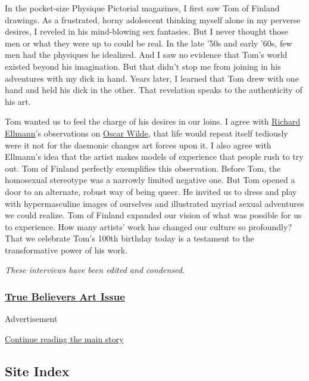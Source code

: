 In the pocket-size Physique Pictorial magazines, I first saw Tom of
Finland drawings. As a frustrated, horny adolescent thinking myself
alone in my perverse desires, I reveled in his mind-blowing sex
fantasies. But I never thought those men or what they were up to could
be real. In the late '50s and early '60s, few men had the physiques he
idealized. And I saw no evidence that Tom's world existed beyond his
imagination. But that didn't stop me from joining in his adventures with
my dick in hand. Years later, I learned that Tom drew with one hand and
held his dick in the other. That revelation speaks to the authenticity
of his art.

Tom wanted us to feel the charge of his desires in our loins. I agree
with
\href{https://www.nytimes.com/1987/05/14/obituaries/richard-ellmann-dies-at-69-eminent-james-joyce-scholar.html}{Richard
Ellmann}'s observations on
\href{https://www.nytimes.com/2018/10/02/t-magazine/oscar-wilde-temple-london.html}{Oscar
Wilde}, that life would repeat itself tediously were it not for the
daemonic changes art forces upon it. I also agree with Ellmann's idea
that the artist makes models of experience that people rush to try out.
Tom of Finland perfectly exemplifies this observation. Before Tom, the
homosexual stereotype was a narrowly limited negative one. But Tom
opened a door to an alternate, robust way of being queer. He invited us
to dress and play with hypermasculine images of ourselves and
illustrated myriad sexual adventures we could realize. Tom of Finland
expanded our vision of what was possible for us to experience. How many
artists' work has changed our culture so profoundly? That we celebrate
Tom's 100th birthday today is a testament to the transformative power of
his work.

\emph{These interviews have been edited and condensed.}

\hypertarget{true-believers-art-issue}{%
\subsubsection{\texorpdfstring{\href{https://www.nytimes.com/issue/t-magazine/2020/07/02/true-believers-art-issue}{True
Believers Art
Issue}}{True Believers Art Issue}}\label{true-believers-art-issue}}

Advertisement

\protect\hyperlink{after-bottom}{Continue reading the main story}

\hypertarget{site-index}{%
\subsection{Site Index}\label{site-index}}

